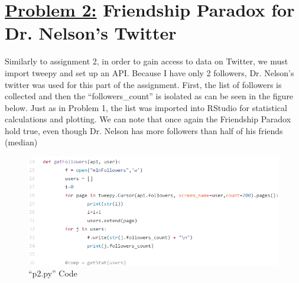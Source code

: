 \documentclass{article}
\begin{document}
\newpage
\section*{{\underline{\huge {Problem 2:}} Friendship Paradox for Dr. Nelson's Twitter}}
Similarly to assignment 2, in order to gain access to data on Twitter, we must import tweepy and set up an API. Because I have only 2 followers, Dr. Nelson's twitter was used for this part of the assignment. First, the list of followers is collected and then the ``followers\_count'' is isolated as can be seen in the figure below. Just as in Problem 1, the list was imported into RStudio for  statistical calculations and plotting. We can note that once again the Friendship Paradox hold true, even though Dr. Nelson has more followers than half of his friends (median) 

\begin{figure}[H]
 \centering
 	\includegraphics{p2code.png}
  \caption{``p2.py'' Code }
\end{figure}
\end{document}
